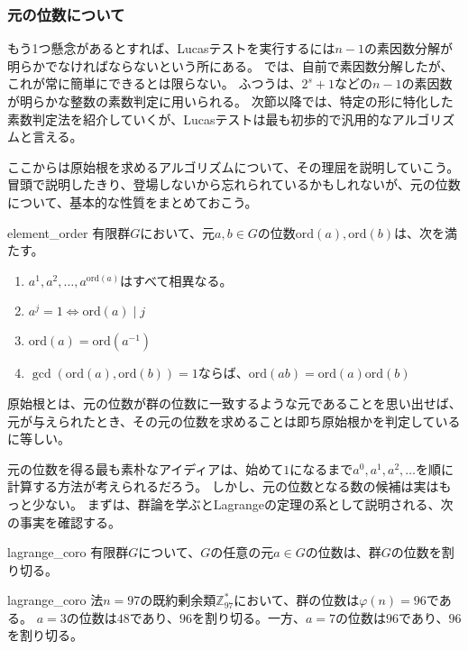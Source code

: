\subsubsection{元の位数について}
もう1つ懸念があるとすれば、Lucasテストを実行するには$n-1$の素因数分解が明らかでなければならないという所にある。
では、自前で素因数分解したが、これが常に簡単にできるとは限らない。
ふつうは、$2^s+1$などの$n-1$の素因数が明らかな整数の素数判定に用いられる。
次節以降では、特定の形に特化した素数判定法を紹介していくが、Lucasテストは最も初歩的で汎用的なアルゴリズムと言える。

ここからは原始根を求めるアルゴリズムについて、その理屈を説明していこう。
冒頭で説明したきり、登場しないから忘れられているかもしれないが、元の位数について、基本的な性質をまとめておこう。

\begin{Prop}{}{element_order}
有限群$G$において、元$a,b\in G$の位数$\mbox{ord}(a), \mbox{ord}(b)$は、次を満たす。
\begin{enumerate}
\item $a^1,a^2,\ldots,a^{\mbox{ord}(a)}$はすべて相異なる。
\item $a^j=1 \iff \mbox{ord}(a) \mid j$
\item $\mbox{ord}(a) = \mbox{ord}(a^{-1})$
\item $\gcd(\mbox{ord}(a), \mbox{ord}(b))=1$ならば、$\mbox{ord}(ab)=\mbox{ord}(a)\mbox{ord}(b)$
\end{enumerate}
\end{Prop}

原始根とは、元の位数が群の位数に一致するような元であることを思い出せば、元が与えられたとき、その元の位数を求めることは即ち原始根かを判定しているに等しい。

元の位数を得る最も素朴なアイディアは、始めて$1$になるまで$a^0, a^1, a^2, \ldots$を順に計算する方法が考えられるだろう。
しかし、元の位数となる数の候補は実はもっと少ない。
まずは、群論を学ぶとLagrangeの定理の系として説明される、次の事実を確認する。

\begin{Prop}{}{lagrange_coro}
有限群$G$について、$G$の任意の元$a\in G$の位数は、群$G$の位数を割り切る。
\end{Prop}

\begin{Exam}{}{lagrange_coro}
法$n=97$の既約剰余類$\mathbb{Z}_{97}^*$において、群の位数は$\varphi(n)=96$である。
$a=3$の位数は$48$であり、$96$を割り切る。一方、$a=7$の位数は$96$であり、$96$を割り切る。
\end{Exam}

